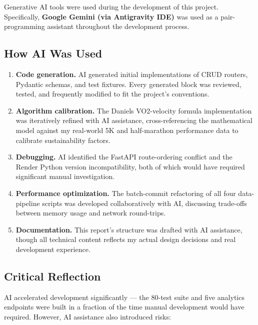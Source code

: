 \documentclass[10pt,a4paper]{article}
\begin{document}
Generative AI tools were used during the development of this project. Specifically, \textbf{Google Gemini (via Antigravity IDE)} was used as a pair-programming assistant throughout the development process.

\subsection{How AI Was Used}

\begin{enumerate}[leftmargin=1.5em]
  \item \textbf{Code generation.} AI generated initial implementations of CRUD routers, Pydantic schemas, and test fixtures. Every generated block was reviewed, tested, and frequently modified to fit the project's conventions.
  \item \textbf{Algorithm calibration.} The Daniels VO2-velocity formula implementation was iteratively refined with AI assistance, cross-referencing the mathematical model against my real-world 5K and half-marathon performance data to calibrate sustainability factors.
  \item \textbf{Debugging.} AI identified the FastAPI route-ordering conflict and the Render Python version incompatibility, both of which would have required significant manual investigation.
  \item \textbf{Performance optimization.} The batch-commit refactoring of all four data-pipeline scripts was developed collaboratively with AI, discussing trade-offs between memory usage and network round-trips.
  \item \textbf{Documentation.} This report's structure was drafted with AI assistance, though all technical content reflects my actual design decisions and real development experience.
\end{enumerate}

\subsection{Critical Reflection}

AI accelerated development significantly --- the 80-test suite and five analytics endpoints were built in a fraction of the time manual development would have required. However, AI assistance also introduced risks:
\end{document}
